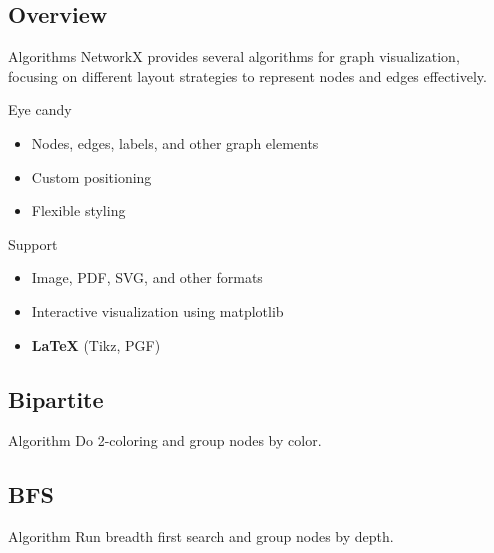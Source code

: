 \documentclass[11pt]{beamer}
\begin{document}
\subsection{Overview}
\begin{frame}{\subsecname}
    \begin{block}{Algorithms}
        NetworkX provides several algorithms for graph visualization, focusing
        on different layout strategies to represent nodes and edges effectively.
    \end{block}

    \pause
    \begin{block}{Eye candy}
        \begin{itemize}
            \pause
            \item Nodes, edges, labels, and other graph elements
            \pause
            \item Custom positioning
            \pause
            \item Flexible styling
        \end{itemize}
    \end{block}

    \pause
    \begin{block}{Support}
        \begin{itemize}
            \pause
            \item Image, PDF, SVG, and other formats
            \pause
            \item Interactive visualization using matplotlib
            \pause
            \item \textbf{LaTeX} (Tikz, PGF)
        \end{itemize}
    \end{block}
\end{frame}

\subsection{Bipartite}
\begin{frame}{\subsecname}

    \begin{block}{Algorithm}
        Do 2-coloring and group nodes by color.
    \end{block}

    \pause
    \resizebox{0.8\textwidth}{!}{}
\end{frame}

\subsection{BFS}
\begin{frame}{\subsecname}

    \begin{block}{Algorithm}
        Run breadth first search and group nodes by depth.\\
    \end{block}

    \pause
    \resizebox{0.8\textwidth}{!}{}

\end{frame}
\end{document}

